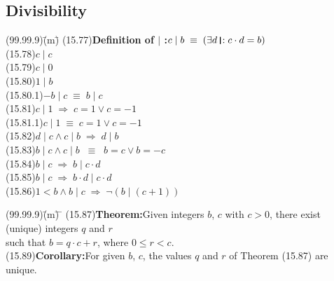 \documentclass{amsart}
\newcommand{\lgap}{2pt}                             %
\newcommand{\equivs}{\ensuremath{\;\equiv\;}}       %
\newcommand{\equivss}{\ensuremath{\;\;\equiv\;\;}}  %
\newcommand{\impls}{\ensuremath{\;\Rightarrow\;}}   %
\newcommand{\thedr}{\rule[-.25ex]{.32mm}{1.75ex}}   %
\newcommand{\drrb}{\;\thedr\,{:}\;}                 %
\newcommand{\ext}{\exists}                          %
\begin{document}
\subsection*{Divisibility}
\begin{tabbing}
(99.99.9)\;\=(m)\;\= \kill
(15.77)\>\textbf{Definition of $\mid$ :}\quad $c \mid b \equivs (\ext d\drrb c\cdot d = b)$\\[\lgap]
(15.78)\>$c \mid c$\\[\lgap]
(15.79)\>$c \mid 0$\\[\lgap]
(15.80)\>$1 \mid b$\\[\lgap]
(15.80.1)\>$-b \mid c \equivs b \mid c$\\[\lgap]
(15.81)\>$c \mid 1 \impls c=1 \lor c=-1$\\[\lgap]
(15.81.1)\>$c \mid 1 \equivs c=1 \lor c=-1$\\[\lgap]
(15.82)\>$d \mid c \land c \mid b \impls d \mid b$\\[\lgap]
(15.83)\>$b \mid c \land c \mid b \equivss b=c \lor b=-c$\\[\lgap]
(15.84)\>$b \mid c \impls b \mid c\cdot d$\\[\lgap]
(15.85)\>$b \mid c \impls b\cdot d \mid c\cdot d$\\[\lgap]
(15.86)\>$1<b \land b \mid c \impls \neg(b \mid (c+1))$\\[\lgap]
\end{tabbing}

\begin{tabbing}
(99.99.9)\;\=(m)\;\= \makebox[2in]{ } \= \kill
(15.87)\>\textbf{Theorem:}\quad Given integers $b$, $c$ with $c > 0$, there exist (unique) integers $q$ and $r$\\[\lgap]
       \>such that $b=q\cdot c + r$, where $0\le r < c$.\\[\lgap]
(15.89)\>\textbf{Corollary:}\quad For given $b$, $c$, the values $q$ and $r$ of Theorem (15.87) are unique.\\[\lgap]
\end{tabbing}
\end{document}
